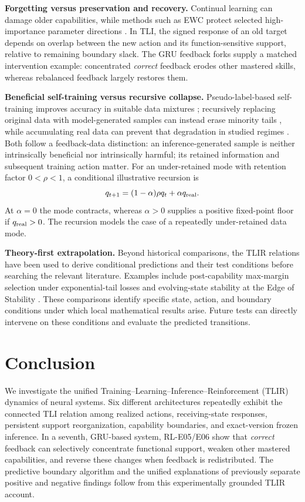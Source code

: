 \documentclass[conference,10pt]{IEEEtran}
\begin{document}
\noindent\textbf{Forgetting versus preservation and recovery.}
Continual learning can damage older capabilities, while methods such as EWC protect selected high-importance parameter directions \cite{kirkpatrick2017}. In TLI, the signed response of an old target depends on overlap between the new action and its function-sensitive support, relative to remaining boundary slack. The GRU feedback forks supply a matched intervention example: concentrated \emph{correct} feedback erodes other mastered skills, whereas rebalanced feedback largely restores them. 

\noindent\textbf{Beneficial self-training versus recursive collapse.}
Pseudo-label-based self-training improves accuracy in suitable data mixtures \cite{xie2020}; recursively replacing original data with model-generated samples can instead erase minority tails \cite{shumailov2024}, while accumulating real data can prevent that degradation in studied regimes \cite{gerstgrasser2024}. Both follow a feedback-data distinction: an inference-generated sample is neither intrinsically beneficial nor intrinsically harmful; its retained information and subsequent training action matter. For an under-retained mode with retention factor $0<\rho<1$, a conditional illustrative recursion is
\begin{equation}
 q_{t+1}=(1-\alpha)\rho q_t+\alpha q_{\rm real}.
 \label{eq:feedback}
\end{equation}
At $\alpha=0$ the mode contracts, whereas $\alpha>0$ supplies a positive fixed-point floor if $q_{\rm real}>0$. The recursion models the case of a repeatedly under-retained data mode.

\noindent\textbf{Theory-first extrapolation.}
Beyond historical comparisons, the TLIR relations have been used to derive conditional predictions and their test conditions before searching the relevant literature. Examples include post-capability max-margin selection under exponential-tail losses \cite{soudry2018} and evolving-state stability at the Edge of Stability \cite{cohen2021}. These comparisons identify specific state, action, and boundary conditions under which local mathematical results arise. Future tests can directly intervene on these conditions and evaluate the predicted transitions.

\section{Conclusion}
We investigate the unified Training--Learning--Inference--Reinforcement (TLIR) dynamics of neural systems. Six different architectures repeatedly exhibit the connected TLI relation among realized actions, receiving-state responses, persistent support reorganization, capability boundaries, and exact-version frozen inference. In a seventh, GRU-based system, RL-E05/E06 show that \emph{correct} feedback can selectively concentrate functional support, weaken other mastered capabilities, and reverse these changes when feedback is redistributed. The predictive boundary algorithm and the unified explanations of previously separate positive and negative findings follow from this experimentally grounded TLIR account.
\end{document}
